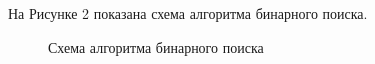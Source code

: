 \documentclass[14pt, a4paper]{extarticle}
\begin{document}
	На Рисунке 2 показана схема алгоритма бинарного поиска.
	\begin{figure}[h!]
		\caption{Схема алгоритма бинарного поиска}
	\end{figure}
	\clearpage
	
\end{document}

